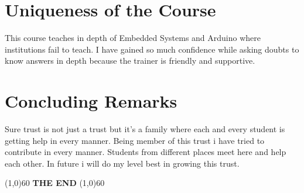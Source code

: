 \documentclass[12pt]{article}
\begin{document}
\section*{Uniqueness of the Course}
This course teaches in depth of Embedded Systems and Arduino where institutions fail to teach. I have gained so much confidence while asking doubts to know answers in depth because the trainer is friendly and supportive.

\section*{Concluding Remarks}
Sure trust is not just a trust but it’s a family where each and every student is getting help in every manner. Being member of this trust i have tried to contribute in every manner. Students from different places meet here and help each other. In future i will do my level best in growing this trust.
\\
\vspace{1.4in}
\begin{center}
\line(1,0){60}
{\Large \textbf{THE END}}
\line(1,0){60}
\end{center}
\end{document}

